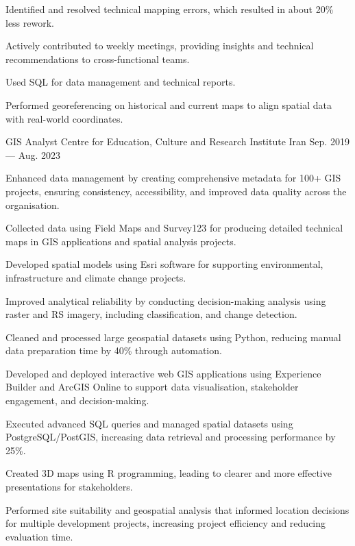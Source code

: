 \begin{cventries}
{\begin{cvitems}
\item {Identified and resolved technical mapping errors, which resulted in about 20\% less rework.}
\item {Actively contributed to weekly meetings, providing insights and technical recommendations to cross-functional teams.}
\item {Used SQL for data management and technical reports.}
\item {Performed georeferencing on historical and current maps to align spatial data with real-world coordinates.}
\vspace{0.8em}
\end{cvitems}
}
\cventry
{GIS Analyst} %
{Centre for Education, Culture and Research Institute} %
{Iran} %
{Sep. 2019 --- Aug. 2023} %
{
\begin{cvitems}
\item {Enhanced data management by creating comprehensive metadata for 100+ GIS projects, ensuring consistency, accessibility, and improved data quality across the organisation.}
\item {Collected data using Field Maps and Survey123 for producing detailed technical maps in GIS applications and spatial analysis projects.}
\item {Developed spatial models using Esri software for supporting environmental, infrastructure and climate change projects.}
\item {Improved analytical reliability by conducting decision-making analysis using raster and RS imagery, including classification, and change detection.}
\item {Cleaned and processed large geospatial datasets using Python, reducing manual data preparation time by 40\% through automation.}
\item {Developed and deployed interactive web GIS applications using Experience Builder and ArcGIS Online to support data visualisation, stakeholder engagement, and decision-making.}
\item {Executed advanced SQL queries and managed spatial datasets using PostgreSQL/PostGIS, increasing data retrieval and processing performance by 25\%.}
\item {Created 3D maps using R programming, leading to clearer and more effective presentations for stakeholders.}
\item {Performed site suitability and geospatial analysis that informed location decisions for multiple development projects, increasing project efficiency and reducing evaluation time.}

\end{cvitems}}
\end{cventries}
